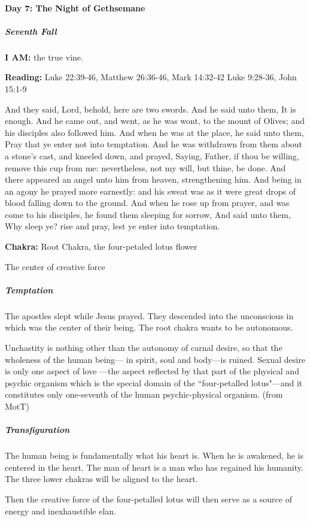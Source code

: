 \paragraph{Day 7: The Night of Gethsemane}

\subparagraph{Seventh Fall}

\textbf{I AM:} the true vine.


\textbf{Reading:} Luke 22:39-46, Matthew 26:36-46, Mark 14:32-42 Luke 9:28-36, John 15:1-9


\begin{quotex}
And they said, Lord, behold, here are two swords. And he said unto them, It is enough. And he came out, and went, as he was wont, to the mount of Olives; and his disciples also followed him. And when he was at the place, he said unto them, Pray that ye enter not into temptation. And he was withdrawn from them about a stone's cast, and kneeled down, and prayed, Saying, Father, if thou be willing, remove this cup from me: nevertheless, not my will, but thine, be done. And there appeared an angel unto him from heaven, strengthening him. And being in an agony he prayed more earnestly: and his sweat was as it were great drops of blood falling down to the ground. And when he rose up from prayer, and was come to his disciples, he found them sleeping for sorrow, And said unto them, Why sleep ye? rise and pray, lest ye enter into temptation. 

\end{quotex}

\textbf{Chakra:} Root Chakra, the four-petaled lotus flower

The center of creative force


\subparagraph{Temptation}

The apostles slept while Jesus prayed. They descended into the unconscious in which was the center of their being. The root chakra wants to be autonomous.

Unchastity is nothing other than the autonomy of carnal desire, so that the wholeness of the human being— in spirit, soul and body—is ruined. Sexual desire is only one aspect of love —the aspect reflected by that part of the physical and psychic organism which is the special domain of the ``four-petalled lotus"—and it constitutes only one-seventh of the human psychic-physical organism. (from MotT)


\subparagraph{Transfiguration}

The human being is fundamentally what his heart is. When he is awakened, he is centered in the heart. The man of heart is a man who has regained his humanity. The three lower chakras will be aligned to the heart.


Then the creative force of the four-petalled lotus will then serve as a source of energy and inexhaustible elan.

